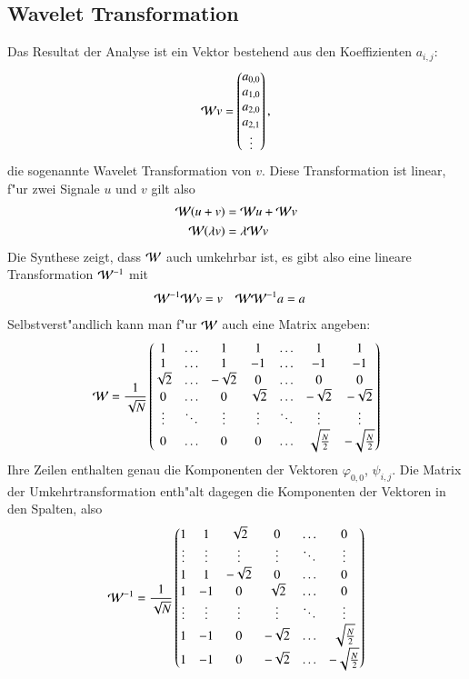 \subsection{Wavelet Transformation}
Das Resultat der Analyse ist ein Vektor bestehend aus den Koeffizienten
$a_{i,j}$:
$$
{\cal W}v=\begin{pmatrix}a_{0,0}\\a_{1,0}\\a_{2,0}\\a_{2,1}\\\vdots\end{pmatrix},
$$
die sogenannte Wavelet Transformation von $v$.
Diese Transformation ist linear, f"ur zwei Signale $u$ und $v$ gilt also
\begin{align*}
{\cal W}(u+v)&={\cal W}u+{\cal W}v\\
{\cal W}(\lambda v)&=\lambda{\cal W}v
\end{align*}
Die Synthese zeigt, dass ${\cal W}$ auch umkehrbar ist, es gibt also
eine lineare Transformation ${\cal W}^{-1}$ mit
\begin{align*}
{\cal W}^{-1}{\cal W}v&=v
&
{\cal W}{\cal W}^{-1}a&=a
\end{align*}
Selbstverst"andlich kann man f"ur $\cal W$ auch eine Matrix angeben:
$$
{\cal W}
=
\frac1{\sqrt{N}}
\begin{pmatrix}
1&\dots&1&1&\dots&1&1\\
1&\dots&1&-1&\dots&-1&-1\\
\sqrt{2}&\dots&-\sqrt{2}&0&\dots&0&0\\
0&\dots&0&\sqrt{2}&\dots&-\sqrt{2}&-\sqrt{2}\\
\vdots&\ddots&\vdots&\vdots&\ddots&\vdots&\vdots\\
0&\dots&0&0&\dots&\sqrt{\frac{N}2}&-\sqrt{\frac{N}2}
\end{pmatrix}
$$
Ihre Zeilen enthalten genau die Komponenten der Vektoren
$\varphi_{0,0}$, $\psi_{i,j}$.
Die Matrix der Umkehrtransformation enth"alt dagegen die
Komponenten der Vektoren in den Spalten, also
$$
{\cal W}^{-1}
=
\frac1{\sqrt{N}}
\begin{pmatrix}
1&1&\sqrt{2}&0&\dots&0\\
\vdots&\vdots&\vdots&\vdots&\ddots&\vdots\\
1&1&-\sqrt{2}&0&\dots&0\\
1&-1&0&\sqrt{2}&\dots&0\\
\vdots&\vdots&\vdots&\vdots&\ddots&\vdots\\
1&-1&0&-\sqrt{2}&\dots&\sqrt{\frac{N}2}\\
1&-1&0&-\sqrt{2}&\dots&-\sqrt{\frac{N}2}
\end{pmatrix}
$$

